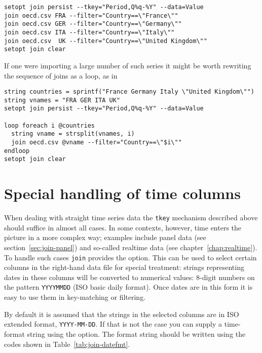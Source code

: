 \begin{footnotesize}
\begin{verbatim}
setopt join persist --tkey="Period,Q%q-%Y" --data=Value
join oecd.csv FRA --filter="Country==\"France\""
join oecd.csv GER --filter="Country==\"Germany\""
join oecd.csv ITA --filter="Country==\"Italy\""
join oecd.csv  UK --filter="Country==\"United Kingdom\""
setopt join clear
\end{verbatim}
\end{footnotesize}

If one were importing a large number of such series it might be worth
rewriting the sequence of joins as a loop, as in

\begin{footnotesize}
\begin{verbatim}
string countries = sprintf("France Germany Italy \"United Kingdom\"")
string vnames = "FRA GER ITA UK"
setopt join persist --tkey="Period,Q%q-%Y" --data=Value

loop foreach i @countries
  string vname = strsplit(vnames, i)
  join oecd.csv @vname --filter="Country==\"$i\""
endloop
setopt join clear
\end{verbatim}
\end{footnotesize}

\section{Special handling of time columns}
\label{sec:join-tconvert}

When dealing with straight time series data the \texttt{tkey}
mechanism described above should suffice in almost all cases. In some
contexts, however, time enters the picture in a more complex way;
examples include panel data (see section~\ref{sec:join-panel}) and
so-called realtime data (see chapter~\ref{chap:realtime}). To handle
such cases \texttt{join} provides the  option. This
can be used to select certain columns in the right-hand data file for
special treatment: strings representing dates in these columns will be
converted to numerical values: 8-digit numbers on the pattern
\texttt{YYYYMMDD} (ISO basic daily format).  Once dates are in this
form it is easy to use them in key-matching or filtering.

By default it is assumed that the strings in the selected columns are
in ISO extended format, \texttt{YYYY-MM-DD}. If that is not
the case you can supply a time-format string using the
 option. The format string should be written using
the codes shown in Table~\ref{tab:join-datefmt}.


